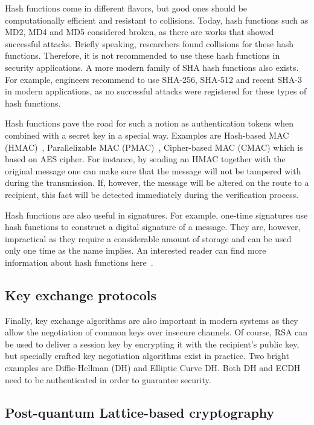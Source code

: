 Hash functions come in different flavors, but good ones should be computationally 
efficient and resistant to collisions. Today, hash functions such as MD2, MD4 and MD5 
considered broken, as there are works that showed successful attacks. Briefly speaking, 
researchers found collisions for these hash functions. Therefore, it is 
not recommended to use these hash functions in security applications. A more modern 
family of SHA hash functions also exists. For example, engineers recommend to use SHA-256, 
SHA-512 and recent SHA-3 in modern applications, as no successful attacks were registered for 
these types of hash functions.

Hash functions pave the road for such a notion as authentication tokens when combined with a 
secret key in a special way. Examples are Hash-based MAC (HMAC)~\cite{Stinson:Cryptography}, 
Parallelizable MAC (PMAC)~\cite{pmac}, Cipher-based MAC (CMAC) which is based on AES cipher. 
For instance, by sending an HMAC together with the original message one can make sure that 
the message will not be tampered with during the transmission. If, however, the message will 
be altered on the route to a recipient, this fact will be detected immediately during the 
verification process.

Hash functions are also useful in signatures. For example, one-time signatures use 
hash functions to construct a digital signature of a message. They are, however, impractical
as they require a considerable amount of storage and can be used only one time as the name implies. 
An interested reader can find more information about hash functions here~\cite{Stinson:Cryptography}.

\subsection{Key exchange protocols}

Finally, key exchange algorithms are also important in modern systems as they allow 
the negotiation of common keys over insecure channels. Of course, RSA can be used to deliver a session key
by encrypting it with the recipient's public key, but specially crafted key negotiation
algorithms exist in practice. Two bright examples are Diffie-Hellman (DH) and Elliptic Curve 
DH. Both DH and ECDH need to be authenticated in order to guarantee security.


\subsection{Post-quantum Lattice-based cryptography}


